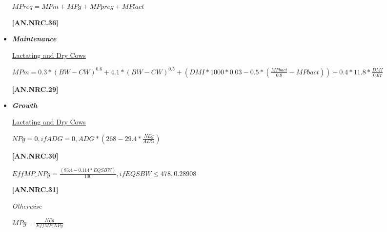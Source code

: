 \begin{refsection}
\begin{itemize}
\begin{center}
    \(MPreq = MPm + MPg + MPpreg + MPlact\)
\end{center}

\vspace{0.5cm}
            {\raggedleft \textbf{[AN.NRC.36]}\par}
        
                \item \textbf{\textit{Maintenance}}
        
        \vspace{0.2cm}
        \underline {Lactating and Dry Cows}
        \vspace{0.2cm}

\begin{center}
    \(MPm = 0.3 * (BW - CW)^{0.6} + 4.1 * (BW - CW)^{0.5} + (DMI * 1000 * 0.03 - 0.5 * (\frac{MPbact}{0.8} - MPbact)) + 0.4 * 11.8 * \frac{DMI}{0.67}\)
\end{center}

\vspace{0.5cm}
            {\raggedleft \textbf{[AN.NRC.29]}\par}
        
                \item \textbf{\textit{Growth}}
        \vspace{0.2cm}


        \underline {Lactating and Dry Cows}
        \vspace{0.2cm}

\begin{center}
    \(NPg = 0, if ADG = 0, ADG * (268 - 29.4 * \frac{NEg}{ADG})\)
\end{center}

\vspace{0.5cm}
            {\raggedleft \textbf{[AN.NRC.30]}\par}
        \vspace{0.2cm}

\begin{center}
    \(EffMP\_NPg = \frac{(83.4 - 0.114 * EQSBW)}{100}, if EQSBW \leq 478, 0
    .28908\)
\end{center}
\vspace{0.5cm}

            {\raggedleft \textbf{[AN.NRC.31]}\par}
\textit{\small Otherwise}
        \vspace{0.2cm}

\begin{center}
    \(MPg = \frac{NPg}{EffMP\_NPg}\)
\end{center}
\vspace{0.5cm}


\end{itemize}
\end{refsection}
